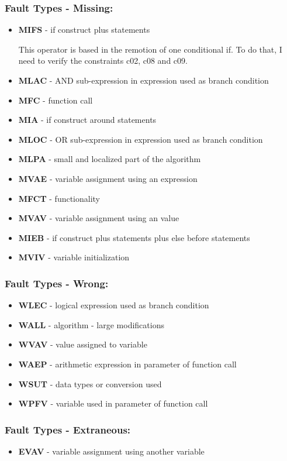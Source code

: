 \subsubsection{Fault Types - Missing:}
\begin{itemize}
	\item \textbf{MIFS} - if construct plus statements

	This operator is based in the remotion of one conditional if. To do that, I need to verify the constraints c02, c08 and c09.
	\item \textbf{MLAC} - AND sub-expression in expression used as branch condition
	\item \textbf{MFC}  - function call
	\item \textbf{MIA}  - if construct around statements
	\item \textbf{MLOC} - OR sub-expression in expression used as branch condition
	\item \textbf{MLPA} - small and localized part of the algorithm
	\item \textbf{MVAE} - variable assignment using an expression
	\item \textbf{MFCT} - functionality
	\item \textbf{MVAV} - variable assignment using an value
	\item \textbf{MIEB} - if construct plus statements plus else before statements
	\item \textbf{MVIV} - variable initialization
\end{itemize}

\subsubsection{Fault Types - Wrong:}
\begin{itemize}
	\item \textbf{WLEC} - logical expression used as branch condition
	\item \textbf{WALL} - algorithm - large modifications
	\item \textbf{WVAV} - value assigned to variable
	\item \textbf{WAEP} - arithmetic expression in parameter of function call
	\item \textbf{WSUT} - data types or conversion used
	\item \textbf{WPFV} - variable used in parameter of function call
\end{itemize}

\subsubsection{Fault Types - Extraneous:}
\begin{itemize}
	\item \textbf{EVAV} - variable assignment using another variable
\end{itemize}


